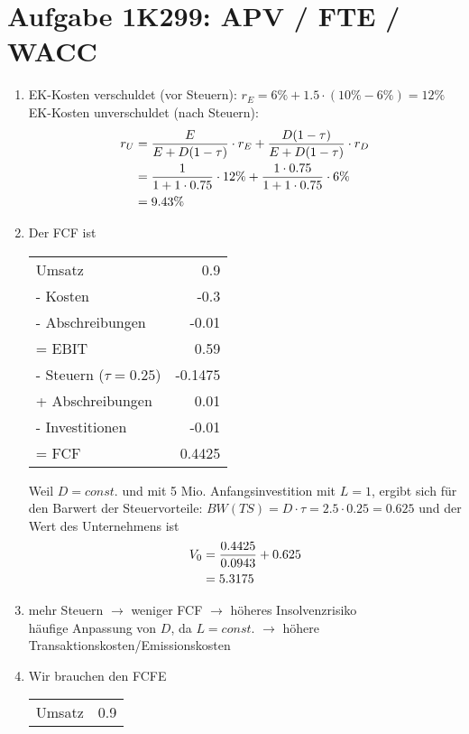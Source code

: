 \documentclass{article}
\begin{document}
	\section*{Aufgabe 1K299: APV / FTE / WACC}
	\begin{enumerate}[label=(\alph*)]
		\item EK-Kosten verschuldet (vor Steuern): $r_E=6\% + 1.5\cdot (10\%-6\%)=12\%$ \\
		EK-Kosten unverschuldet (nach Steuern):
		\begin{align}
			r_U &= \frac{E}{E+D(1-\tau)} \cdot r_E + \frac{D(1-\tau)}{E+D(1-\tau)} \cdot r_D \notag \\
			&= \frac{1}{1+1\cdot 0.75}\cdot 12\% + \frac{1\cdot 0.75}{1+1\cdot 0.75}\cdot 6\% \notag \\
			&= 9.43\% \notag
		\end{align}
		\item Der FCF ist
		\begin{center}
			\begin{tabular}{l|r}
				Umsatz & 0.9 \\
				- Kosten & -0.3 \\
				- Abschreibungen & -0.01 \\
				\hline
				= EBIT & 0.59 \\
				- Steuern ($\tau=0.25$) & -0.1475 \\
				+ Abschreibungen & 0.01 \\
				- Investitionen & -0.01 \\
				\hline
				= FCF & 0.4425
			\end{tabular}
		\end{center}
		Weil $D=const.$ und mit 5 Mio. Anfangsinvestition mit $L=1$, ergibt sich für den Barwert der Steuervorteile: $BW(TS) = D\cdot \tau = 2.5\cdot 0.25 = 0.625$ und der Wert des Unternehmens ist
		\begin{align}
			V_0 &= \frac{0.4425}{0.0943} + 0.625 \notag \\
			&= 5.3175 \notag
		\end{align}
		\item mehr Steuern $\to$ weniger FCF $\to$ höheres Insolvenzrisiko \\
		häufige Anpassung von $D$, da $L=const.$ $\to$ höhere Transaktionskosten/Emissionskosten
		\item Wir brauchen den FCFE
			\begin{center}
			\begin{tabular}{l|r}
				Umsatz & 0.9 \\

\end{tabular}
\end{center}
\end{enumerate}
\end{document}
